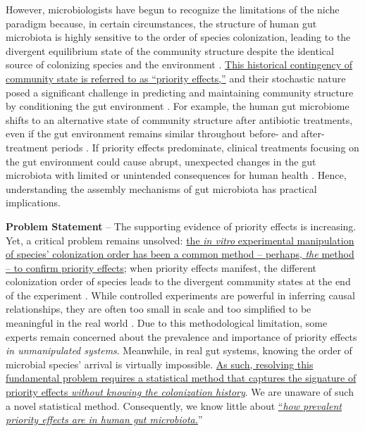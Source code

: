 \documentclass[12pt, class=article, crop=false]{standalone}
\begin{document}
However, microbiologists have begun to recognize the limitations of the niche paradigm because, in certain circumstances, the structure of human gut microbiota is highly sensitive to the order of species colonization, leading to the divergent equilibrium state of the community structure despite the identical source of colonizing species and the environment \citep{fierer_animalcules_2012, ojima_priority_2022}.
\ul{This historical contingency of community state is referred to as ``priority effects,''} and their stochastic nature posed a significant challenge in predicting and maintaining community structure by conditioning the gut environment \citep{fukami_historical_2015}.
For example, the human gut microbiome shifts to an alternative state of community structure after antibiotic treatments, even if the gut environment remains similar throughout before- and after-treatment periods \citep{dominguez-bello_development_2011}.
If priority effects predominate, clinical treatments focusing on the gut environment could cause abrupt, unexpected changes in the gut microbiota \citep{chase_community_2003, chase_stochastic_2010, fukami_historical_2015} with limited or unintended consequences for human health \citep{sprockett_role_2018}. 
Hence, understanding the assembly mechanisms of gut microbiota has practical implications.

\textbf{Problem Statement} --
The supporting evidence of priority effects is increasing.
Yet, a critical problem remains unsolved: \ul{the \textit{in vitro} experimental manipulation of species' colonization order has been a common method -- perhaps, \textit{the} method -- to confirm priority effects}; when priority effects manifest, the different colonization order of species leads to the divergent community states at the end of the experiment \citep{fukami_historical_2015, sprockett_role_2018}.
While controlled experiments are powerful in inferring causal relationships, they are often too small in scale and too simplified to be meaningful in the real world \citep{weidlich_priority_2021}.
Due to this methodological limitation, some experts remain concerned about the prevalence and importance of priority effects \textit{in unmanipulated systems}.
Meanwhile, in real gut systems, knowing the order of microbial species' arrival is virtually impossible.
\ul{As such, resolving this fundamental problem requires a statistical method that captures the signature of priority effects \textit{without knowing the colonization history}}.
We are unaware of such a novel statistical method. 
Consequently, we know little about \ul{``\textit{how prevalent priority effects are in human gut microbiota.}}'' 
\end{document}

